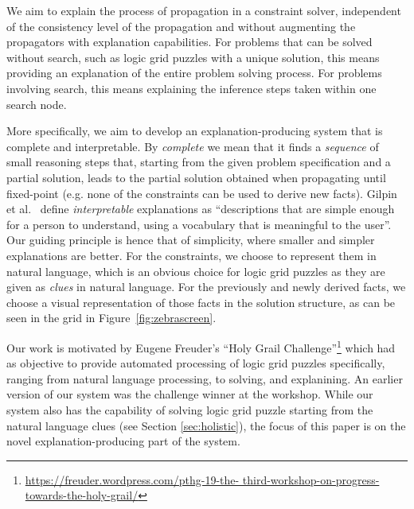 We aim to explain the process of propagation in a constraint solver, independent of the consistency level of the propagation and without augmenting the propagators with explanation capabilities.
For problems that can be solved without search, such as logic grid puzzles with a unique solution, this means providing an explanation of the entire problem solving process. For problems involving search, this means explaining the inference steps taken within one search node.

More specifically, we aim to develop an explanation-producing system that is complete and interpretable. By \textit{complete} we mean that it finds a \textit{sequence} of small reasoning steps that, starting from the given problem specification and a partial solution, leads to the partial solution obtained when propagating until fixed-point (e.g. none of the constraints can be used to derive new facts). %
%
Gilpin et al.~\cite{DBLP:conf/dsaa/GilpinBYBSK18} define \textit{interpretable} explanations as ``descriptions that are simple enough for a person to understand, using a vocabulary that is meaningful to the user''. Our guiding principle is hence that of simplicity, where smaller and simpler explanations are better. %
For the constraints, we choose to represent them in natural language, which is an obvious choice for logic grid puzzles as they are given as \textit{clues} in natural language. For the previously and newly derived facts, we choose a visual representation of those facts in the solution structure, as can be seen in the grid in Figure~\ref{fig:zebrascreen}.

Our work is motivated by Eugene Freuder's ``Holy Grail Challenge''\footnote{\tiny \url{https://freuder.wordpress.com/pthg-19-the- third-workshop-on-progress-towards-the-holy-grail/}} which had as objective to provide automated processing of logic grid puzzles specifically, ranging from natural language processing, to solving, and explanining. 
An earlier version of our system was the challenge winner at the workshop. 
While our system also has the capability of solving logic grid puzzle starting from the natural language clues (see Section \ref{sec:holistic}), the focus of this paper is on the novel explanation-producing part of the system.

